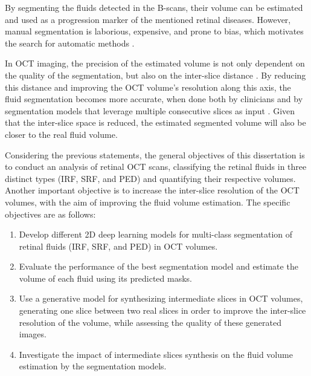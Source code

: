 \par
By segmenting the fluids detected in the B-scans, their volume can be estimated and used as a progression marker of the mentioned retinal diseases. However, manual segmentation is laborious, expensive, and prone to bias, which motivates the search for automatic methods \parencite{Viedma2022}. 
\par
In OCT imaging, the precision of the estimated volume is not only dependent on the quality of the segmentation, but also on the inter-slice distance \parencite{Lopez2023}. By reducing this distance and improving the OCT volume's resolution along this axis, the fluid segmentation becomes more accurate, when done both by clinicians and by segmentation models that leverage multiple consecutive slices as input \parencite{Selvi2013}. Given that the inter-slice space is reduced, the estimated segmented volume will also be closer to the real fluid volume.
\par
Considering the previous statements, the general objectives of this dissertation is to conduct an analysis of retinal OCT scans, classifying the retinal fluids in three distinct types (IRF, SRF, and PED) and quantifying their respective volumes. Another important objective is to increase the inter-slice resolution of the OCT volumes, with the aim of improving the fluid volume estimation. The specific objectives are as follows:  
\begin{enumerate}
	\item Develop different 2D deep learning models for multi-class segmentation of retinal fluids (IRF, SRF, and PED) in OCT volumes.
	\item Evaluate the performance of the best segmentation model and estimate the volume of each fluid using its predicted masks.
	\item Use a generative model for synthesizing intermediate slices in OCT volumes, generating one slice between two real slices in order to improve the inter-slice resolution of the volume, while assessing the quality of these generated images.
	\item Investigate the impact of intermediate slices synthesis on the fluid volume estimation by the segmentation models. 
\end{enumerate}
\par
